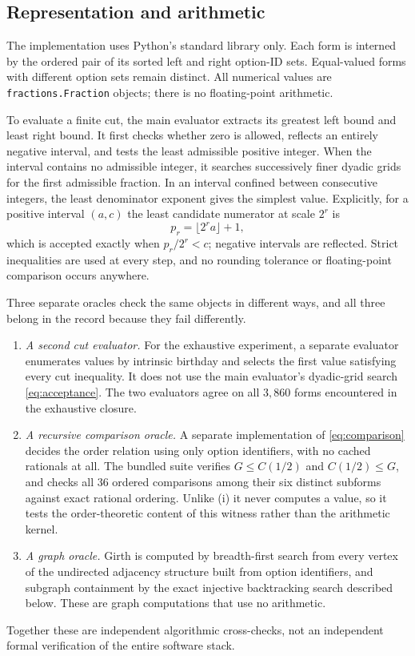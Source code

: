\documentclass[11pt,a4paper]{article}
\numberwithin{equation}{section}
\theoremstyle{definition}
\theoremstyle{remark}
\newcommand{\can}{C}
\newcommand{\code}[1]{\texttt{#1}}
\begin{document}
\subsection{Representation and arithmetic}

The implementation uses Python's standard library only. Each form is interned
by the ordered pair of its sorted left and right option-ID sets. Equal-valued
forms with different option sets remain distinct. All numerical values are
\code{fractions.Fraction} objects; there is no floating-point arithmetic.

To evaluate a finite cut, the main evaluator extracts its greatest left bound
and least right bound. It first checks whether zero is allowed, reflects an
entirely negative interval, and tests the least admissible positive integer.
When the interval contains no admissible integer, it searches successively
finer dyadic grids for the first admissible fraction. In an interval confined
between consecutive integers, the least denominator exponent gives the
simplest value. Explicitly, for a positive interval $(a,c)$ the least candidate
numerator at scale $2^r$ is
\begin{equation}
\label{eq:acceptance}
 p_r=\lfloor 2^r a\rfloor+1,
\end{equation}
which is accepted exactly when $p_r/2^r<c$; negative intervals are reflected.
Strict inequalities are used at every step, and no rounding tolerance or
floating-point comparison occurs anywhere.

Three separate oracles check the same objects in different ways, and all three
belong in the record because they fail differently.
\begin{enumerate}[label=(\roman*),leftmargin=2.2em]
\item \emph{A second cut evaluator.} For the exhaustive experiment, a separate
 evaluator enumerates values by intrinsic birthday and selects the first value
 satisfying every cut inequality. It does not use the main evaluator's
 dyadic-grid search \eqref{eq:acceptance}. The two evaluators agree on all
 $3{,}860$ forms encountered in the exhaustive closure.
\item \emph{A recursive comparison oracle.} A separate implementation of
 \eqref{eq:comparison} decides the order relation using only option
 identifiers, with no cached rationals at all. The bundled suite verifies
 $G\leq\can(1/2)$ and $\can(1/2)\leq G$, and checks all $36$ ordered
 comparisons among their six distinct subforms against exact rational ordering.
 Unlike (i) it never computes a value, so it tests the order-theoretic content
 of this witness rather than the arithmetic kernel.
\item \emph{A graph oracle.} Girth is computed by breadth-first search from
 every vertex of the undirected adjacency structure built from option
 identifiers, and subgraph containment by the exact injective backtracking
 search described below. These are graph computations that use no arithmetic.
\end{enumerate}
Together these are independent algorithmic cross-checks, not an independent
formal verification of the entire software stack.
\end{document}
